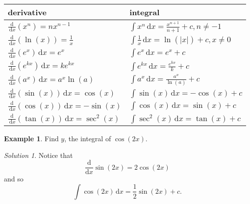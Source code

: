 \documentclass[
  english,
  11pt,
  oneside]{book}
\newcommand{\slide}{}
\theoremstyle{definition}
\theoremstyle{definition}
\newtheorem{example}{Example}[chapter]
\theoremstyle{definition}
\theoremstyle{definition}
\theoremstyle{remark}
\newtheorem*{solution}{Solution}
\begin{document}
\begin{longtable}[]{@{}
  >{\raggedright\arraybackslash}p{}
  >{\raggedright\arraybackslash}p{}@{}}
\toprule\noalign{}
\begin{minipage}[b]{\linewidth}\raggedright
derivative
\end{minipage} & \begin{minipage}[b]{\linewidth}\raggedright
integral
\end{minipage} \\
\midrule\noalign{}
\endhead
\bottomrule\noalign{}
\endlastfoot
\(\frac{\mathrm{d}}{\,\mathrm{d}x}(x^n)=nx^{n-1}\) & \(\displaystyle\int x^n\,\mathrm{d}x = \frac{x^{n+1}}{n+1}+c, n\ne -1\) \\
\(\frac{\mathrm{d}}{\,\mathrm{d}x}(\ln(x)) = \frac 1x\) & \(\displaystyle\int\frac{1}{x}\,\mathrm{d}x = \ln(                     | x | )+c, x\neq0\) \\
\(\frac{\mathrm{d}}{\,\mathrm{d}x}(e^x)\,\mathrm{d}x = e^x\) & \(\displaystyle\int e^x \,\mathrm{d}x = e^x + c\) \\
\(\frac{\mathrm{d}}{\,\mathrm{d}x}(e^{kx})\,\mathrm{d}x = ke^{kx}\) & \(\displaystyle\int e^{kx} \,\mathrm{d}x = \frac{e^{kx}}{k} + c\) \\
\(\frac{\mathrm{d}}{\,\mathrm{d}x}(a^x)\,\mathrm{d}x = a^x\ln(a)\) & \(\displaystyle\int a^x \,\mathrm{d}x = \frac{a^x}{\ln(a)} + c\) \\
\(\frac{\mathrm{d}}{\,\mathrm{d}x}(\sin(x))\,\mathrm{d}x=\cos(x)\) & \(\displaystyle\int \sin(x)\,\mathrm{d}x=-\cos(x)+c\) \\
\(\frac{\mathrm{d}}{\,\mathrm{d}x}(\cos(x))\,\mathrm{d}x=-\sin(x)\) & \(\displaystyle\int \cos(x)\,\mathrm{d}x=\sin(x)+c\) \\
\(\frac{\mathrm{d}}{\,\mathrm{d}x}(\tan(x))\,\mathrm{d}x=\sec^2(x)\) & \(\displaystyle\int \sec^2(x)\,\mathrm{d}x=\tan(x)+c\) \\
\end{longtable}

\slide

\begin{example}
\protect\hypertarget{exm:cos-example}{}\label{exm:cos-example}Find \(y\), the integral of \(\cos(2x)\).
\end{example}

\begin{solution}
Notice that
\[
\frac{\mathrm{d}}{\mathrm{d}x}\sin(2x) = 2\cos(2x)
\]
and so
\[
\int\cos(2x)\,\mathrm{d}x = \frac12\sin(2x)+c.
\]
\end{solution}
\end{document}
